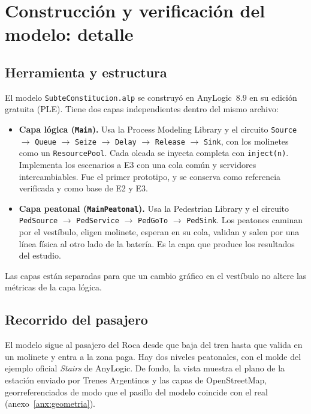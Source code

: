 \section{Construcción y verificación del modelo: detalle}
\label{anx:modelo}

\subsection{Herramienta y estructura}
\label{anx:estructura}

El modelo \texttt{SubteConstitucion.alp} se construyó en AnyLogic~8.9 en su edición gratuita (PLE). Tiene
dos capas independientes dentro del mismo archivo:

\begin{itemize}
  \item \textbf{Capa lógica (\texttt{Main}).} Usa la Process Modeling Library y el circuito
        \texttt{Source} $\to$ \texttt{Queue} $\to$ \texttt{Seize} $\to$ \texttt{Delay} $\to$
        \texttt{Release} $\to$ \texttt{Sink}, con los molinetes como un \texttt{ResourcePool}. Cada oleada
        se inyecta completa con \texttt{inject(n)}. Implementa los escenarios \EO{} a E3 con una cola común
        y servidores intercambiables. Fue el primer prototipo, y se conserva como referencia verificada y
        como base de E2 y E3.
  \item \textbf{Capa peatonal (\texttt{MainPeatonal}).} Usa la Pedestrian Library y el circuito
        \texttt{PedSource} $\to$ \texttt{PedService} $\to$ \texttt{PedGoTo} $\to$ \texttt{PedSink}. Los
        peatones caminan por el vestíbulo, eligen molinete, esperan en su cola, validan y salen por una
        línea física al otro lado de la batería. Es la capa que produce los resultados del estudio.
\end{itemize}

Las capas están separadas para que un cambio gráfico en el vestíbulo no altere las métricas de la capa
lógica.

\subsection{Recorrido del pasajero}
\label{anx:recorrido}

El modelo sigue al pasajero del Roca desde que baja del tren hasta que valida en un molinete y entra a la zona
paga. Hay dos niveles peatonales, con el molde del ejemplo oficial \emph{Stairs} de AnyLogic. De fondo, la vista
muestra el plano de la estación enviado por Trenes Argentinos y las capas de OpenStreetMap, georreferenciados de
modo que el pasillo del modelo coincide con el real (anexo~\ref{anx:geometria}).

